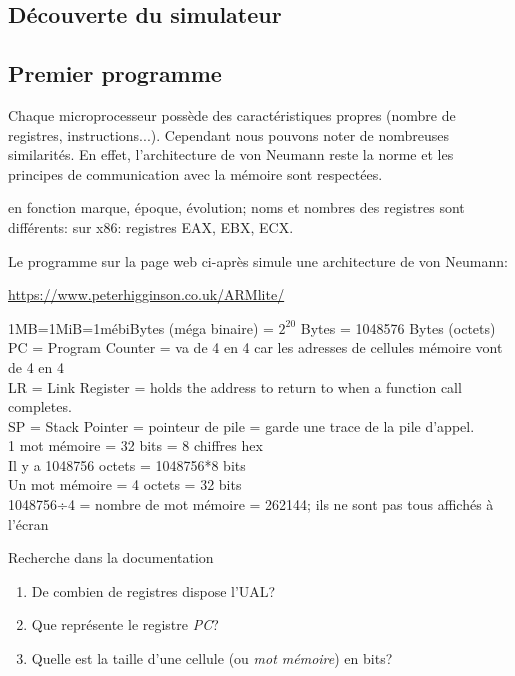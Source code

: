 \documentclass[a4paper,11pt]{article}
\begin{document}
\begin{Form}
\section{Découverte du simulateur}
\subsection{Premier programme}
Chaque microprocesseur possède des caractéristiques propres (nombre de registres, instructions...). Cependant nous pouvons noter de nombreuses similarités. En effet, l'architecture de von Neumann reste la norme et les principes de communication avec la mémoire sont respectées.\\
\begin{commentprof}
en fonction marque, époque, évolution; noms et nombres des registres sont différents: sur x86: registres EAX, EBX, ECX.
\end{commentprof}
Le programme sur la page web ci-après simule une architecture de von Neumann:
\begin{center}
\url{https://www.peterhigginson.co.uk/ARMlite/}
\end{center}
\begin{commentprof}
\noindent 1MB=1MiB=1mébiBytes (méga binaire) = $2^{20}$ Bytes = 1048576 Bytes (octets)\\ PC = Program Counter = va de 4 en 4 car les adresses de cellules mémoire vont de 4 en 4\\LR = Link Register = holds the address to return to when a function call completes.\\SP = Stack Pointer = pointeur de pile = garde une trace de la pile d'appel.\\1 mot mémoire = 32 bits = 8 chiffres hex\\Il y a 1048756 octets = 1048756*8 bits\\Un mot mémoire = 4 octets = 32 bits\\1048756÷4 = nombre de mot mémoire = 262144; ils ne sont pas tous affichés à l'écran
\end{commentprof}
\begin{activite} Recherche dans la documentation
\begin{enumerate}
\item De combien de registres dispose l'UAL?
\item Que représente le registre \emph{PC}?
\item Quelle est la taille d'une cellule (ou \emph{mot mémoire}) en bits?

\end{enumerate}
\end{activite}
\end{Form}
\end{document}
